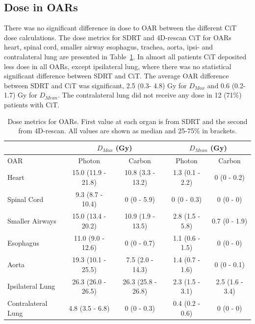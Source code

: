 \documentclass[type=dr, dr=rernat, acm$^3$entcolor=tud7b,colorbacktitle, bigchapter, openright, twoside, 12pt ]{tudthesis}
\begin{document}
\subsection{Dose in OARs}

There was no significant difference in dose to OAR between the different CiT dose calculations. The dose metrics for SDRT and 4D-rescan CiT for 
OARs heart, spinal cord, smaller airway esophagus, trachea, aorta, ipsi- and contralateral lung are presented in Table~\ref{tab:results}. 
In almost all patients CiT deposited less dose in all OARs, except ipsilateral lung, where there was no statistical significant difference between SDRT and CiT. 
The average OAR difference between SDRT and CiT was significant, 2.5 (0.3- 4.8) Gy for $D_{Max}$ and 0.6 (0.2- 1.7) Gy for $D_{Mean}$. 
The contralateral lung did not receive any dose in 12 (71\%) patients with CiT.

\begin{table}[H]
  \centering
  \caption{Dose metrics for OARs. First value at each organ is from SDRT and the second from 4D-rescan. All values are shown as median and 25-75\% in brackets.}
  \begin{tabular}{l|c|c|c|c|}
    \cline{2-5}
     & \multicolumn{2}{|c|}{$D_{Max}$ (Gy)} & \multicolumn{2}{|c|}{$D_{Mean}$ (Gy)} \\
     \hline
    \multicolumn{1}{|l|}{OAR} & Photon & Carbon & Photon & Carbon	\\
    \hline
\multicolumn{1}{|l|}{Heart} & 15.0 (11.9 - 21.8) & 10.8 (3.3 - 13.2) & 1.3 (0.1 - 2.2) & 0 (0 - 0.2)	\\
\multicolumn{1}{|l|}{Spinal Cord} & 9.3 (8.7 - 10.4) & 0 (0 - 5.9) & 0 (0 - 0.3) & 0 (0 - 0)	\\
\multicolumn{1}{|l|}{Smaller Airways} & 15.0 (13.4 - 20.2) & 10.9 (1.9 - 13.5) & 2.8 (1.5 - 5.8) & 0.7 (0 - 1.9)	\\
\multicolumn{1}{|l|}{Esophagus} & 11.0 (9.0 - 12.6) & 0 (0 - 0.7) & 1.1 (0.6 - 1.5) & 0 (0 - 0)	\\
\multicolumn{1}{|l|}{Aorta} & 19.3 (10.1 - 25.5) & 7.5 (2.0 - 14.3) & 1.4 (0.7 - 1.6) & 0 (0 - 0.1)	\\
\multicolumn{1}{|l|}{Ipsilateral Lung} & 26.3 (26.0 - 26.5) & 26.3 (25.8 - 26.8) & 2.3 (1.5 - 3.1) & 2.5 (1.6 - 3.4)	\\
\multicolumn{1}{|l|}{Contralateral Lung} & 4.8 (3.5 - 6.8) & 0 (0 - 0.3) & 0.4 (0.2 - 0.6) & 0 (0 - 0)	\\
    \hline\hline
  \end{tabular}
  \label{tab:results}
\end{table}
\end{document}

